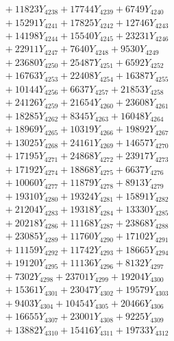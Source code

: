 \documentclass[a4paper,10pt]{article}
\begin{document}
{\begin{align}
&\;  + 11823 Y_{4238} + 17744 Y_{4239} + 6749 Y_{4240} \\[0.3ex]
&\;  + 15291 Y_{4241} + 17825 Y_{4242} + 12746 Y_{4243} \\[0.3ex]
&\;  + 14198 Y_{4244} + 15540 Y_{4245} + 23231 Y_{4246} \\[0.3ex]
&\;  + 22911 Y_{4247} + 7640 Y_{4248} + 9530 Y_{4249} \\[0.3ex]
&\;  + 23680 Y_{4250} + 25487 Y_{4251} + 6592 Y_{4252} \\[0.3ex]
&\;  + 16763 Y_{4253} + 22408 Y_{4254} + 16387 Y_{4255} \\[0.3ex]
&\;  + 10144 Y_{4256} + 6637 Y_{4257} + 21853 Y_{4258} \\[0.5ex]\allowbreak
&\;  + 24126 Y_{4259} + 21654 Y_{4260} + 23608 Y_{4261} \\[0.3ex]
&\;  + 18285 Y_{4262} + 8345 Y_{4263} + 16048 Y_{4264} \\[0.3ex]
&\;  + 18969 Y_{4265} + 10319 Y_{4266} + 19892 Y_{4267} \\[0.3ex]
&\;  + 13025 Y_{4268} + 24161 Y_{4269} + 14657 Y_{4270} \\[0.3ex]
&\;  + 17195 Y_{4271} + 24868 Y_{4272} + 23917 Y_{4273} \\[0.3ex]
&\;  + 17192 Y_{4274} + 18868 Y_{4275} + 6637 Y_{4276} \\[0.3ex]
&\;  + 10060 Y_{4277} + 11879 Y_{4278} + 8913 Y_{4279} \\[0.3ex]
&\;  + 19310 Y_{4280} + 19324 Y_{4281} + 15891 Y_{4282} \\[0.3ex]
&\;  + 21204 Y_{4283} + 19318 Y_{4284} + 13330 Y_{4285} \\[0.3ex]
&\;  + 20218 Y_{4286} + 11168 Y_{4287} + 23868 Y_{4288} \\[0.5ex]\allowbreak
&\;  + 23085 Y_{4289} + 11760 Y_{4290} + 17102 Y_{4291} \\[0.3ex]
&\;  + 11159 Y_{4292} + 11742 Y_{4293} + 18665 Y_{4294} \\[0.3ex]
&\;  + 19120 Y_{4295} + 11136 Y_{4296} + 8132 Y_{4297} \\[0.3ex]
&\;  + 7302 Y_{4298} + 23701 Y_{4299} + 19204 Y_{4300} \\[0.3ex]
&\;  + 15361 Y_{4301} + 23047 Y_{4302} + 19579 Y_{4303} \\[0.3ex]
&\;  + 9403 Y_{4304} + 10454 Y_{4305} + 20466 Y_{4306} \\[0.3ex]
&\;  + 16655 Y_{4307} + 23001 Y_{4308} + 9225 Y_{4309} \\[0.3ex]
&\;  + 13882 Y_{4310} + 15416 Y_{4311} + 19733 Y_{4312} \\[0.3ex]

\end{align}}
\end{document}
